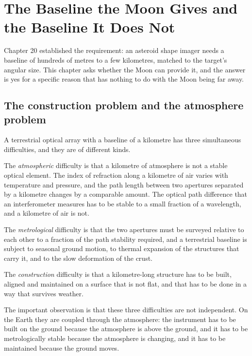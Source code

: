
\chapter{The Baseline the Moon Gives and the Baseline It Does Not}
\label{ch:baseline}

Chapter 20 established the requirement: an asteroid shape imager needs a
baseline of hundreds of metres to a few kilometres, matched to the target's
angular size. This chapter asks whether the Moon can provide it, and the
answer is yes for a specific reason that has nothing to do with the Moon
being far away.

\section{The construction problem and the atmosphere problem}

A terrestrial optical array with a baseline of a kilometre has three
simultaneous difficulties, and they are of different kinds.

The \emph{atmospheric} difficulty is that a kilometre of atmosphere is not a
stable optical element. The index of refraction along a kilometre of air
varies with temperature and pressure, and the path length between two
apertures separated by a kilometre changes by a comparable amount. The
optical path difference that an interferometer measures has to be stable to
a small fraction of a wavelength, and a kilometre of air is not.

The \emph{metrological} difficulty is that the two apertures must be
surveyed relative to each other to a fraction of the path stability
required, and a terrestrial baseline is subject to seasonal ground motion,
to thermal expansion of the structures that carry it, and to the slow
deformation of the crust.

The \emph{construction} difficulty is that a kilometre-long structure has to
be built, aligned and maintained on a surface that is not flat, and that
has to be done in a way that survives weather.

The important observation is that these three difficulties are not
independent. On the Earth they are coupled through the atmosphere: the
instrument has to be built on the ground because the atmosphere is above the
ground, and it has to be metrologically stable because the atmosphere is
changing, and it has to be maintained because the ground moves.

